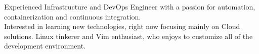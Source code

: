
\begin{cvparagraph}
Experienced Infrastructure and DevOps Engineer with a passion for automation, containerization and continuous integration. \\ Interested in learning new technologies, right now focusing mainly on Cloud solutions. Linux tinkerer and Vim enthusiast, who enjoys to customize all of the development environment.
\end{cvparagraph}
